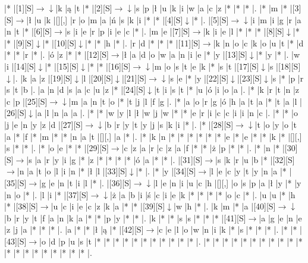 \documentclass[11pt]{article}
\newcommand\drarr{$\rightarrow \!\!\!\!\! \downarrow$}
\newcommand\rarr{$\rightarrow$}
\newcommand\darr{$\downarrow$}
\begin{document}
\noindent\begin{Puzzle}{19}{26}|*	|[1][S]\drarr	|k	|ą	|t	|*	|[2][S]\drarr	|s	|p	|ł	|u	|k	|i	|w	|a	|c	|z	|*	|*	|*	|.
|*	|m	|*	|[3][S]\rarr	|ł	|u	|k	|[][,]{ }	|r	|o	|m	|a	|ń	|s	|k	|i	|*	|*	|[4][S]\darr	|*	|.
|[5][S]\drarr	|i	|m	|i	|g	|r	|a	|n	|t	|*	|[6][S]\rarr	|s	|i	|e	|r	|p	|i	|e	|c	|*	|.
|m	|e	|[7][S]\rarr	|k	|i	|e	|l	|*	|*	|*	|[8][S]\darr	|*	|*	|[9][S]\darr	|*	|[10][S]\darr	|*	|*	|h	|*	|.
|r	|d	|*	|*	|*	|[11][S]\rarr	|k	|n	|o	|c	|k	|o	|u	|t	|*	|d	|*	|*	|r	|*	|.
|ó	|z	|*	|*	|[12][S]\rarr	|ł	|a	|d	|o	|w	|a	|n	|i	|e	|*	|y	|[13][S]\darr	|*	|y	|*	|.
|w	|i	|[14][S]\darr	|*	|[15][S]\darr	|*	|*	|[16][S]\drarr	|m	|o	|s	|t	|e	|k	|*	|s	|t	|[17][S]\darr	|s	|[18][S]\darr	|.
|k	|a	|z	|[19][S]\darr	|l	|[20][S]\darr	|[21][S]\drarr	|s	|e	|*	|y	|[22][S]\darr	|[23][S]\darr	|s	|*	|p	|r	|s	|t	|b	|.
|a	|n	|d	|s	|a	|c	|u	|z	|*	|[24][S]\darr	|t	|i	|s	|t	|*	|u	|ó	|i	|o	|a	|.
|*	|k	|r	|t	|n	|z	|c	|p	|[25][S]\drarr	|m	|a	|n	|t	|o	|*	|t	|j	|l	|f	|g	|.
|*	|a	|o	|r	|g	|ó	|h	|a	|t	|a	|*	|t	|a	|l	|[26][S]\darr	|a	|l	|n	|a	|a	|.
|*	|*	|w	|y	|l	|ł	|w	|j	|w	|*	|*	|e	|r	|i	|c	|c	|i	|i	|n	|c	|.
|*	|*	|o	|j	|e	|n	|y	|z	|d	|[27][S]\drarr	|b	|r	|y	|t	|y	|j	|s	|k	|i	|*	|.
|*	|[28][S]\drarr	|t	|o	|y	|o	|t	|a	|*	|f	|*	|m	|*	|*	|n	|a	|t	|[][,]{ }	|a	|*	|.
|*	|k	|n	|*	|*	|*	|*	|*	|*	|e	|*	|e	|*	|*	|k	|*	|[][,]{ }	|s	|*	|*	|.
|*	|o	|e	|*	|*	|[29][S]\rarr	|c	|z	|a	|r	|c	|z	|a	|f	|*	|*	|ż	|p	|*	|*	|.
|*	|n	|*	|[30][S]\rarr	|s	|a	|r	|y	|i	|g	|*	|z	|*	|*	|*	|*	|ó	|a	|*	|*	|.
|[31][S]\rarr	|s	|k	|r	|u	|b	|*	|[32][S]\rarr	|n	|a	|t	|o	|l	|i	|n	|*	|ł	|l	|[33][S]\darr	|*	|.
|*	|y	|[34][S]\rarr	|l	|e	|c	|y	|t	|y	|n	|a	|*	|[35][S]\rarr	|g	|e	|n	|t	|i	|l	|*	|.
|[36][S]\drarr	|l	|e	|n	|i	|u	|c	|h	|[][,]{ }	|o	|s	|p	|a	|ł	|y	|*	|y	|n	|o	|*	|.
|l	|i	|*	|[37][S]\drarr	|ż	|a	|b	|i	|ś	|c	|i	|e	|k	|*	|*	|*	|*	|o	|c	|*	|.
|u	|u	|*	|h	|*	|[38][S]\rarr	|u	|c	|i	|e	|c	|z	|k	|a	|*	|*	|[39][S]\darr	|w	|h	|*	|.
|k	|m	|*	|a	|[40][S]\drarr	|b	|r	|y	|t	|f	|a	|n	|k	|a	|*	|*	|p	|y	|*	|*	|.
|k	|*	|*	|s	|s	|*	|*	|*	|[41][S]\rarr	|a	|g	|e	|n	|e	|z	|j	|a	|*	|*	|*	|.
|a	|*	|*	|ł	|ą	|*	|[42][S]\rarr	|c	|e	|l	|o	|w	|n	|i	|k	|*	|s	|*	|*	|*	|.
|*	|*	|[43][S]\rarr	|o	|d	|p	|u	|s	|t	|*	|*	|*	|*	|*	|*	|*	|*	|*	|*	|*	|.
|*	|*	|*	|*	|*	|*	|*	|*	|*	|*	|*	|*	|*	|*	|*	|*	|*	|*	|*	|*	|.\end{Puzzle}

\newpage
\end{document}
